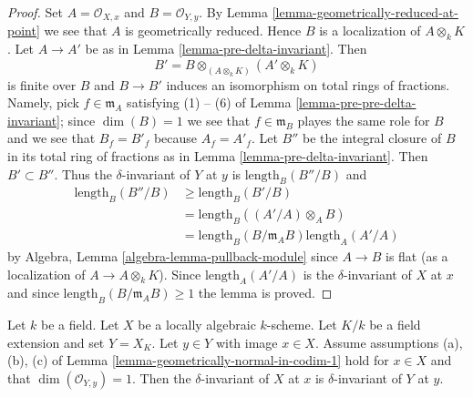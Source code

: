 \begin{proof}
Set $A = \mathcal{O}_{X, x}$ and $B = \mathcal{O}_{Y, y}$.
By Lemma \ref{lemma-geometrically-reduced-at-point}
we see that $A$ is geometrically reduced.
Hence $B$ is a localization of $A \otimes_k K$.
Let $A \to A'$ be as in Lemma \ref{lemma-pre-delta-invariant}.
Then
$$
B' = B \otimes_{(A \otimes_k K)} (A' \otimes_k K)
$$
is finite over $B$ and $B \to B'$ induces
an isomorphism on total rings of fractions. Namely, pick $f \in \mathfrak m_A$
satisfying (1) -- (6) of Lemma \ref{lemma-pre-pre-delta-invariant};
since $\dim(B) = 1$ we see that $f \in \mathfrak m_B$
playes the same role for $B$ and we see that $B_f = B'_f$ because $A_f = A'_f$.
Let $B''$ be the integral closure of $B$ in its
total ring of fractions as in Lemma \ref{lemma-pre-delta-invariant}.
Then $B' \subset B''$. Thus the $\delta$-invariant of $Y$ at $y$ is
$\text{length}_B(B''/B)$ and
\begin{align*}
\text{length}_B(B''/B)
& \geq
\text{length}_B(B'/B) \\
& =
\text{length}_B((A'/A) \otimes_A B) \\
& =
\text{length}_B(B/\mathfrak m_A B) \text{length}_A(A'/A)
\end{align*}
by Algebra, Lemma \ref{algebra-lemma-pullback-module}
since $A \to B$ is flat (as a localization of $A \to A \otimes_k K$).
Since $\text{length}_A(A'/A)$ is the $\delta$-invariant of $X$ at $x$
and since
$\text{length}_B(B/\mathfrak m_A B) \geq 1$ the lemma is proved.
\end{proof}

\begin{lemma}
\label{lemma-delta-invariant-and-change-of-fields-better}
Let $k$ be a field. Let $X$ be a locally algebraic $k$-scheme.
Let $K/k$ be a field extension and set $Y = X_K$.
Let $y \in Y$ with image $x \in X$.
Assume assumptions (a), (b), (c) of
Lemma \ref{lemma-geometrically-normal-in-codim-1}
hold for $x \in X$ and that $\dim(\mathcal{O}_{Y, y}) = 1$.
Then the $\delta$-invariant
of $X$ at $x$ is $\delta$-invariant of $Y$ at $y$.
\end{lemma}


